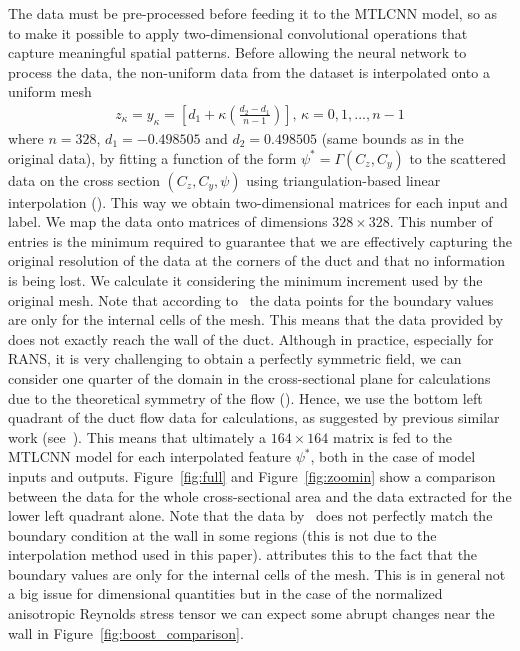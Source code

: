 \documentclass[11pt]{article}
\numberwithin{equation}{section}
\theoremstyle{plain}
\theoremstyle{definition}
\begin{document}
The data must be pre-processed before feeding it to the MTLCNN model, so as to make it possible to apply two-dimensional convolutional operations that capture meaningful spatial patterns. Before allowing the neural network to process the data, the non-uniform data from the dataset is interpolated onto a uniform mesh
\begin{align}
  z_{\kappa} = y_{\kappa} =\left[ d_{1} + \kappa\left( \frac{d_{2}-d_{1}}{n-1}\right)\right],\,\kappa=0,1,...,n-1
\end{align}
where $n=328$, $d_{1}=-0.498505$ and $d_{2}=0.498505$ (same bounds as in the original data), by fitting a function of the form $\psi^{*} = \Gamma(C_{z},C_{y})$ to the scattered data on the cross section $(C_{z},C_{y},\psi)$ using triangulation-based linear interpolation (\cite{interpolation}). This way we obtain two-dimensional matrices for each input and label. We map the data onto matrices of dimensions $328 \times 328$. This number of entries is the minimum required to guarantee that we are effectively capturing the original resolution of the data at the corners of the duct and that no information is being lost. We calculate it considering the minimum increment used by the original mesh. Note that according to~\cite{mcconkey2021curated} the data points for the boundary values are only for the internal cells of the mesh. This means that the data provided  by~\cite{mcconkey2021curated} does not exactly reach the wall of the duct. Although in practice, especially for RANS, it is very challenging to obtain a perfectly symmetric field, we can consider one quarter of the domain in the cross-sectional plane for calculations due to the theoretical symmetry of the flow (\cite{ducts_vinuesa}). Hence, we use the bottom left quadrant of the duct flow data for calculations, as suggested by previous similar work (see~\cite{wu_again,laizet}). This means that ultimately a $164 \times 164$ matrix is fed to the MTLCNN model for each interpolated feature $\psi^{*}$, both in the case of model inputs and outputs. Figure~\ref{fig:full} and Figure~\ref{fig:zoomin} show a comparison between the data for the whole cross-sectional area and the data extracted for the lower left quadrant alone. Note that the data by~\cite{mcconkey2021curated} does not perfectly match the boundary condition at the wall in some regions (this is not due to the interpolation method used in this paper). \cite{mcconkey2021curated} attributes this to the fact that the boundary values are only for the internal cells of the mesh. This is in general not a big issue for dimensional quantities but in the case of the normalized anisotropic Reynolds stress tensor we can expect some abrupt changes near the wall in Figure~\ref{fig:boost_comparison}.
\end{document}

